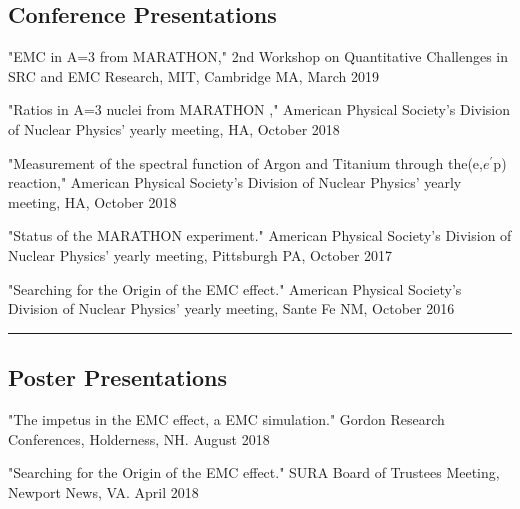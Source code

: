 \documentclass[12pt,letterpaper]{article}
\begin{document}
\subsection*{Conference Presentations}
\begin{itemize*}
	\item "EMC in A=3 from MARATHON," 2nd Workshop on Quantitative Challenges in SRC and EMC Research,  MIT, Cambridge MA,  March 2019
	\item "Ratios in A=3 nuclei from MARATHON ," American Physical Society's Division of Nuclear Physics' yearly meeting, HA, October 2018
	\item "Measurement of the spectral function of Argon and Titanium through the(e,$e^\prime$p) reaction," American Physical Society's Division of Nuclear Physics' yearly meeting, HA, October 2018
	\item "Status of the MARATHON experiment." American Physical Society's Division of Nuclear Physics' yearly meeting, Pittsburgh PA, October 2017
	\item "Searching for the Origin of the EMC effect." American Physical Society's Division of Nuclear Physics' yearly meeting, Sante Fe NM, October 2016
\end{itemize*}

\hrule
\subsection*{Poster Presentations}
\begin{itemize*}
	\item "The impetus in the EMC effect, a EMC simulation." Gordon Research Conferences, Holderness, NH. August 2018 
	\item "Searching for the Origin of the EMC effect." SURA Board of Trustees Meeting, Newport News, VA. April 2018 
\end{itemize*}
\end{document}
